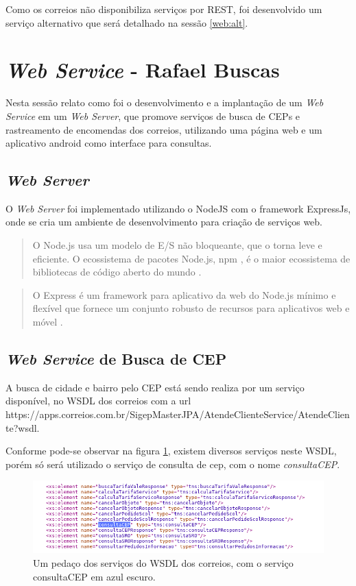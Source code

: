 \documentclass[journal]{IEEEtran}
\begin{document}
Como os correios não disponibiliza serviços por REST, foi desenvolvido um serviço alternativo  que será detalhado na sessão \ref{web:alt}.  

\section{\textit{Web Service} - Rafael Buscas }
Nesta sessão relato como foi o desenvolvimento e a implantação de um \textit{Web Service} em um \textit{Web Server}, que promove serviços de busca de CEPs e rastreamento de encomendas dos correios, utilizando uma página web e um aplicativo android como interface para consultas.

\subsection{\textit{Web Server}}
O \textit{Web Server} foi implementado utilizando o NodeJS com o framework ExpressJs, onde se cria um ambiente de desenvolvimento para criação de serviços web.
\begin{quote}
	O Node.js usa um modelo de E/S não bloqueante, que o torna leve e eficiente. O ecossistema de pacotes Node.js, npm , é o maior ecossistema de bibliotecas de código aberto do mundo \cite{nodejs}.
\end{quote}
\begin{quote}
	O Express é um framework para aplicativo da web do Node.js mínimo e flexível que fornece um conjunto robusto de recursos para aplicativos web e móvel \cite{expressjs}.
\end{quote}

\subsection{\textit{Web Service} de Busca de CEP}\label{web:cep}
A busca de cidade e bairro pelo CEP está sendo realiza por um serviço disponível, no WSDL dos 
correios com a url https://apps.correios.com.br/SigepMasterJPA/AtendeClienteService/AtendeCliente?wsdl.

Conforme pode-se observar na figura \ref{c33}, existem diversos serviços neste WSDL, porém só será utilizado o serviço de consulta de cep, com o nome \textit{consultaCEP}.

\begin{figure}[H]
	\centering
	\includegraphics[scale=0.58]{Imagens/wsdlcep.png}
	\caption{Um pedaço dos serviços do WSDL dos correios, com o serviço consultaCEP em azul escuro.}
	\label{c33}
\end{figure}
\end{document}
